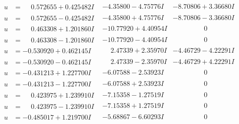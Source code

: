 \documentclass[1p]{elsarticle_modified}
\theoremstyle{definition}
\begin{document}
$$\begin{array}{c|c|c}
\begin{aligned}
u &= \phantom{-}0.572655 + 0.425482 I\end{aligned}
 & -4.35800 - 4.75776 I & -8.70806 + 3.36680 I \\ \hline\begin{aligned}
u &= \phantom{-}0.572655 - 0.425482 I\end{aligned}
 & -4.35800 + 4.75776 I & -8.70806 - 3.36680 I \\ \hline\begin{aligned}
u &= \phantom{-}0.463308 + 1.201860 I\end{aligned}
 & -10.77920 + 4.40954 I & \phantom{-0.000000 } 0 \\ \hline\begin{aligned}
u &= \phantom{-}0.463308 - 1.201860 I\end{aligned}
 & -10.77920 - 4.40954 I & \phantom{-0.000000 } 0 \\ \hline\begin{aligned}
u &= -0.530920 + 0.462145 I\end{aligned}
 & \phantom{-}2.47339 + 2.35970 I & -4.46729 - 4.22291 I \\ \hline\begin{aligned}
u &= -0.530920 - 0.462145 I\end{aligned}
 & \phantom{-}2.47339 - 2.35970 I & -4.46729 + 4.22291 I \\ \hline\begin{aligned}
u &= -0.431213 + 1.227700 I\end{aligned}
 & -6.07588 - 2.53923 I & \phantom{-0.000000 } 0 \\ \hline\begin{aligned}
u &= -0.431213 - 1.227700 I\end{aligned}
 & -6.07588 + 2.53923 I & \phantom{-0.000000 } 0 \\ \hline\begin{aligned}
u &= \phantom{-}0.423975 + 1.239910 I\end{aligned}
 & -7.15358 - 1.27519 I & \phantom{-0.000000 } 0 \\ \hline\begin{aligned}
u &= \phantom{-}0.423975 - 1.239910 I\end{aligned}
 & -7.15358 + 1.27519 I & \phantom{-0.000000 } 0 \\ \hline\begin{aligned}
u &= -0.485017 + 1.219700 I\end{aligned}
 & -5.68867 - 6.60293 I & \phantom{-0.000000 } 0 \\ \hline\begin{aligned}

\end{aligned}
\end{array}$$
\end{document}
